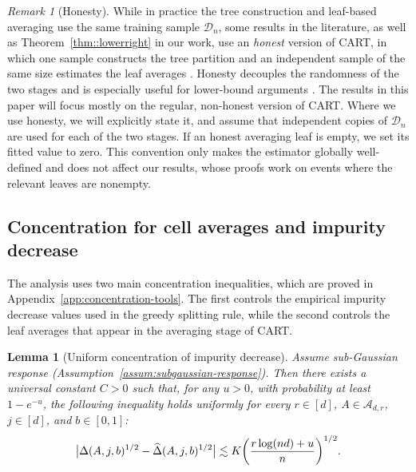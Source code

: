 \documentclass[11pt]{article}
\theoremstyle{plain}
\newtheorem{lemma}[theorem]{Lemma}
\theoremstyle{definition}
\theoremstyle{remark}
\newtheorem{remark}[theorem]{Remark}
\theoremstyle{plain}
\DeclarePairedDelimiter{\paren}{(}{)}
\newcommand{\data}[1][n]{\mathcal{D}_{#1}}
\newcommand{\1}{\mathbbm{1}}
\begin{document}
\begin{remark}[Honesty]
    While in practice the tree construction and leaf-based averaging use the same training sample $\mathcal D_n$, some results in the literature, as well as Theorem~\ref{thm::lowerright} in our work, use an \emph{honest} version of CART, in which one sample constructs the tree partition and an independent sample of the same size estimates the leaf averages \citep{athey2016recursive}. Honesty decouples the randomness of the two stages and is especially useful for lower-bound arguments \citep{tan2022cautionary,cattaneo2025honest}.
    The results in this paper will focus mostly on the regular, non-honest version of CART.
    Where we use honesty, we will explicitly state it, and assume that independent copies of $\data$ are used for each of the two stages.
    If an honest averaging leaf is empty, we set its fitted value to zero. This convention only makes the estimator globally well-defined and does not affect our results, whose proofs work on events where the relevant leaves are nonempty.
\end{remark}

\subsection{Concentration for cell averages and impurity decrease}
\label{section:unif-conc}

The analysis uses two main concentration inequalities, which are proved in Appendix~\ref{app:concentration-tools}. The first controls the empirical impurity decrease values used in the greedy splitting rule, while the second controls the leaf averages that appear in the averaging stage of CART.

\begin{lemma}[Uniform concentration of impurity decrease]
\label{lemma:unif_conc_id}
Assume sub-Gaussian response (Assumption~\ref{assum:subgaussian-response}).
Then there exists a universal constant $C>0$ such that, for any $u>0$, with probability at least $1-e^{-u}$, the following inequality holds uniformly for every $r\in [d]$, $A\in\mathcal{A}_{d,r}$, $j\in[d]$, and $b\in[0,1]$:
\begin{align}
\bigl|\Delta(A,j,b)^{1/2}
-\widehat\Delta(A,j,b)^{1/2}\bigr|\lesssim K
\paren*{\frac{r\log(nd)+u}{n}}^{1/2}. \label{eq:id-conc-conclude-1-1}
\end{align}
\end{lemma}
\end{document}
